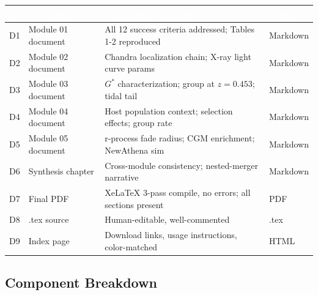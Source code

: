 \documentclass[11pt,letterpaper]{article}
\newcommand{\tableheader}[1]{\textbf{\sffamily\textcolor{white}{#1}}}
\begin{document}
\begin{center}
\begin{tabularx}{\textwidth}{C{0.6cm}L{3.5cm}XC{2cm}}
\toprule
{}
\tableheader{\#} & \tableheader{Deliverable} & \tableheader{Completion Criteria} & \tableheader{Format} \\
\midrule
D1 & Module 01 document & All 12 success criteria addressed; Tables 1-2 reproduced & Markdown \\
D2 & Module 02 document & Chandra localization chain; X-ray light curve params & Markdown \\
D3 & Module 03 document & $G^*$ characterization; group at $z=0.453$; tidal tail & Markdown \\
D4 & Module 04 document & Host population context; selection effects; group rate & Markdown \\
D5 & Module 05 document & r-process fade radius; CGM enrichment; NewAthena sim & Markdown \\
D6 & Synthesis chapter & Cross-module consistency; nested-merger narrative & Markdown \\
D7 & Final PDF & XeLaTeX 3-pass compile, no errors; all sections present & PDF \\
D8 & .tex source & Human-editable, well-commented & .tex \\
D9 & Index page & Download links, usage instructions, color-matched & HTML \\
\bottomrule
\end{tabularx}
\end{center}

\subsection{Component Breakdown}
\end{document}
